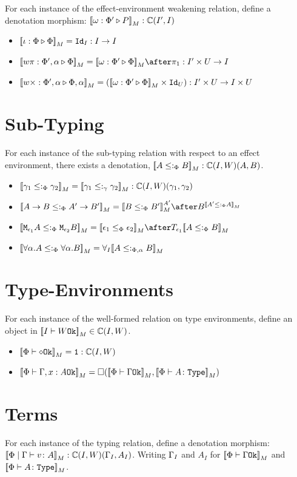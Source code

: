 \documentclass{report}
\newcommand{\allI}[0]{\forall_I}
\newcommand\type[0]{\texttt{Type}}
\newcommand\ciw[0]{\C(I, W)}
\newcommand\cii[0]{\C(I', I)}
\newcommand\subtypeg[0]{\subtype_\g}
\newcommand\subtypepa[0]{\subtype_{\P, \a}}
\begin{document}
For each instance of the effect-environment weakening relation, define a denotation morphism: $\deno{\wrelw{\P'}{P}}: \cii$

\begin{itemize}
    \item ${\bf [\![}\iota : \Phi \triangleright \Phi{\bf ]\!]}_M = \texttt{Id}_{I}: I \rightarrow I$
    \item $\deno{\wrel{w\pi}{\P',\a}{\P}} = \deno{\wrelw{\P'}{\P}}\after \p: I'\times U\rightarrow I$
    \item ${\bf [\![}w\times : \Phi',\alpha \triangleright \Phi,\alpha{\bf ]\!]}_M = ({\bf [\![}\omega : \Phi' \triangleright \Phi{\bf ]\!]}_M\times \texttt{Id}_{U}): I'\times U\rightarrow I\times U$
\end{itemize}
\section{Sub-Typing}
For each instance of the sub-typing relation with respect  to an effect environment, there exists a denotation, $\deno{A\subtypep B}: \ciw(A, B)$.

\begin{itemize}
    \item $\deno{\g_1\subtypep \g_2} = \deno{\g_1\subtypeg \g_2} : \ciw(\g_1, \g_2)$
    \item $\deno{\ab \subtypep \fntype{A'}{B'}} = \deno{B\subtypep B'}^{A'}\after B^{\deno{A'\subtypep A}}$
    \item $\deno{\M{\e_1}{A}\subtypep\M{\e_2}{B}} = \deno{\e_1\subeffectp\e_2}\after\T{\e_1}{\deno{A\subtypep B}}$
    \item $\deno{\all{\a}{A}\subtypep\all{\a}{B}} = \allI{\deno{A\subtypepa B}}$
\end{itemize}
\section{Type-Environments}

For each instance of the well-formed relation on type environments, define an object in $\deno{\wellformedok{I}{W}}\in\ciw$.

\begin{itemize}
    \item $\deno{\wellformedok{\P}{\nil}} = \1: \ciw$
    \item $\deno{\wellformedok{\P}{\gax}} = \square(\deno{\wellformedok{\P}{\G}}, \deno{\typerelation{\P}{A}{\type}})$
\end{itemize}

\section{Terms}
For each instance of the typing relation, define a denotation morphism: $\deno{\gpetyperelation{v}{A}}: \ciw(\G_I, A_I)$. Writing $\Gamma_I$ and $A_I$ for ${\bf [\![}\Phi\vdash \Gamma \texttt{Ok}{\bf ]\!]}_M$ and $\deno{\typerelation{\P}{A}{\type}}$.
\end{document}

